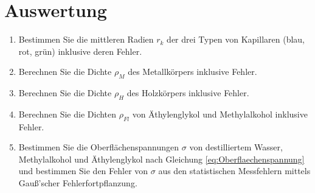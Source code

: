 \section{Auswertung} 
\begin{enumerate}
 \item Bestimmen Sie die mittleren Radien $r_k$ der drei Typen von Kapillaren (blau, rot, grün) inklusive deren Fehler.
 \item Berechnen Sie die Dichte $\rho_M$ des Metallkörpers inklusive Fehler.
 \item Berechnen Sie die Dichte $\rho_H$ des Holzkörpers inklusive Fehler.
 \item Berechnen Sie die Dichten $\rho_{Fl}$ von Äthylenglykol und Methylalkohol inklusive Fehler.
 \item Bestimmen Sie die Oberflächenspannungen $\sigma$ von destilliertem Wasser, Methylalkohol und Äthylenglykol nach Gleichung \ref{eq:Oberflaechenspannung} und bestimmen Sie den Fehler von $\sigma$ aus den statistischen Messfehlern mittels Gauß'scher Fehlerfortpflanzung.
\end{enumerate}